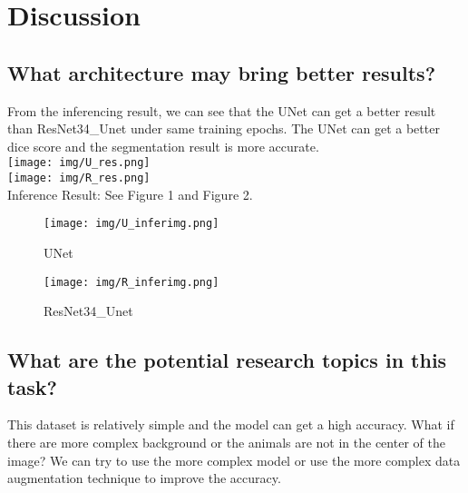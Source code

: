 \documentclass{article} %
\begin{document}
    \section{Discussion}
    \subsection{What architecture may bring better results?}
    From the inferencing result, we can see that the UNet can get a better result than ResNet34\_Unet under same training epochs.
    The UNet can get a better dice score and the segmentation result is more accurate. \\
    \texttt{[image: img/U\_res.png]} \\
    \texttt{[image: img/R\_res.png]} \\
    Inference Result: See Figure 1 and Figure 2. \\
    \begin{figure}
        \centering
        \texttt{[image: img/U\_inferimg.png]}
        \caption{UNet}
    \end{figure}
    \begin{figure}
        \centering
        \texttt{[image: img/R\_inferimg.png]}
        \caption{ResNet34\_Unet}
    \end{figure}
    \subsection{What are the potential research topics in this task?}
    This dataset is relatively simple and the model can get a high accuracy.
    What if there are more complex background or the animals are not in the center of the image?
    We can try to use the more complex model or use the more complex data augmentation technique to improve the accuracy. \\
\end{document}
